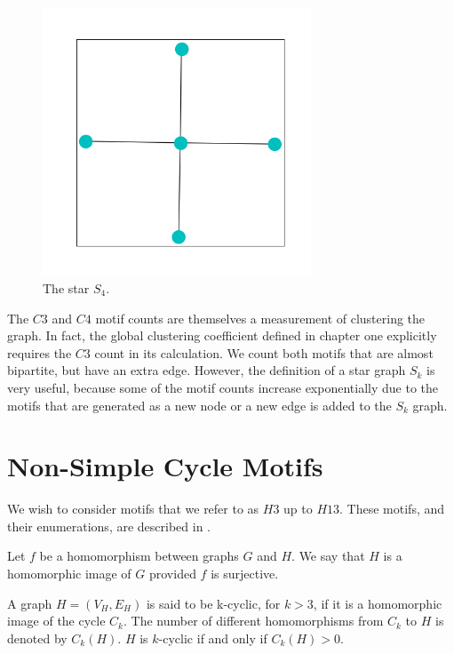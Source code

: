 \begin{figure}[h!]
    \includegraphics[width=8cm]{Images/Star.png}
    \centering
    \caption{The star $S_4$.}
\end{figure}


The $C3$ and $C4$ motif counts are themselves a measurement of clustering the graph. In fact, the
global clustering coefficient defined in chapter one explicitly requires the $C3$ count in its 
calculation. We count both motifs that are almost bipartite, but have an extra edge. However, the definition of a star graph $S_k$ is very useful, because some of the motif counts increase exponentially
due to the motifs that are generated as a new node or a new edge is added to the $S_k$ graph. 


\newpage

\section{Non-Simple Cycle Motifs}
\label{section:Non-simple Motifs}
We wish to consider motifs that we refer to as $H3$ up to $H13$.
These motifs, and their enumerations, are described in \cite{alon}.

\begin{dfn}
    Let $f$ be a homomorphism between graphs $G$ and $H$. We say that $H$ is a
    homomorphic image of $G$ provided $f$ is surjective.
\end{dfn}

\begin{dfn}
    A graph $H = (V_H, E_H)$ is said to be k-cyclic, for $k > 3$, if it is a
homomorphic image of the cycle $C_k$. The number of different homomorphisms from $C_k$
to $H$ is denoted by $C_k(H)$.  $H$ is $k$-cyclic if and only if $C_k(H) > 0$.
\end{dfn}

